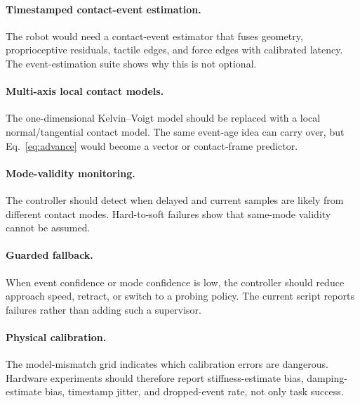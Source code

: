 \documentclass{article}
\begin{document}
\paragraph{Timestamped contact-event estimation.}
The robot would need a contact-event estimator that fuses geometry, proprioceptive residuals, tactile edges, and force edges with calibrated latency. The event-estimation suite shows why this is not optional.

\paragraph{Multi-axis local contact models.}
The one-dimensional Kelvin--Voigt model should be replaced with a local normal/tangential contact model. The same event-age idea can carry over, but Eq.~\ref{eq:advance} would become a vector or contact-frame predictor.

\paragraph{Mode-validity monitoring.}
The controller should detect when delayed and current samples are likely from different contact modes. Hard-to-soft failures show that same-mode validity cannot be assumed.

\paragraph{Guarded fallback.}
When event confidence or mode confidence is low, the controller should reduce approach speed, retract, or switch to a probing policy. The current script reports failures rather than adding such a supervisor.

\paragraph{Physical calibration.}
The model-mismatch grid indicates which calibration errors are dangerous. Hardware experiments should therefore report stiffness-estimate bias, damping-estimate bias, timestamp jitter, and dropped-event rate, not only task success.

\clearpage


\end{document}
